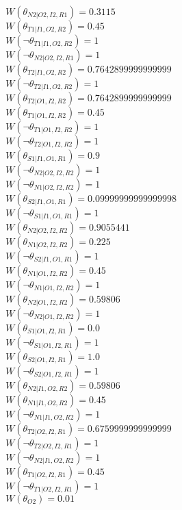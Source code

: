 $W(\theta_{N2|O2,I2,R1})=0.3115$\\
$W(\theta_{T1|I1,O2,R2})=0.45$\\
$W(\neg\theta_{T1|I1,O2,R2})=1$\\
$W(\neg\theta_{N2|O2,I2,R1})=1$\\
$W(\theta_{T2|I1,O2,R2})=0.7642899999999999$\\
$W(\neg\theta_{T2|I1,O2,R2})=1$\\
$W(\theta_{T2|O1,I2,R2})=0.7642899999999999$\\
$W(\theta_{T1|O1,I2,R2})=0.45$\\
$W(\neg\theta_{T1|O1,I2,R2})=1$\\
$W(\neg\theta_{T2|O1,I2,R2})=1$\\
$W(\theta_{S1|I1,O1,R1})=0.9$\\
$W(\neg\theta_{N2|O2,I2,R2})=1$\\
$W(\neg\theta_{N1|O2,I2,R2})=1$\\
$W(\theta_{S2|I1,O1,R1})=0.09999999999999998$\\
$W(\neg\theta_{S1|I1,O1,R1})=1$\\
$W(\theta_{N2|O2,I2,R2})=0.9055441$\\
$W(\theta_{N1|O2,I2,R2})=0.225$\\
$W(\neg\theta_{S2|I1,O1,R1})=1$\\
$W(\theta_{N1|O1,I2,R2})=0.45$\\
$W(\neg\theta_{N1|O1,I2,R2})=1$\\
$W(\theta_{N2|O1,I2,R2})=0.59806$\\
$W(\neg\theta_{N2|O1,I2,R2})=1$\\
$W(\theta_{S1|O1,I2,R1})=0.0$\\
$W(\neg\theta_{S1|O1,I2,R1})=1$\\
$W(\theta_{S2|O1,I2,R1})=1.0$\\
$W(\neg\theta_{S2|O1,I2,R1})=1$\\
$W(\theta_{N2|I1,O2,R2})=0.59806$\\
$W(\theta_{N1|I1,O2,R2})=0.45$\\
$W(\neg\theta_{N1|I1,O2,R2})=1$\\
$W(\theta_{T2|O2,I2,R1})=0.6759999999999999$\\
$W(\neg\theta_{T2|O2,I2,R1})=1$\\
$W(\neg\theta_{N2|I1,O2,R2})=1$\\
$W(\theta_{T1|O2,I2,R1})=0.45$\\
$W(\neg\theta_{T1|O2,I2,R1})=1$\\
$W(\theta_{O2})=0.01$\\
